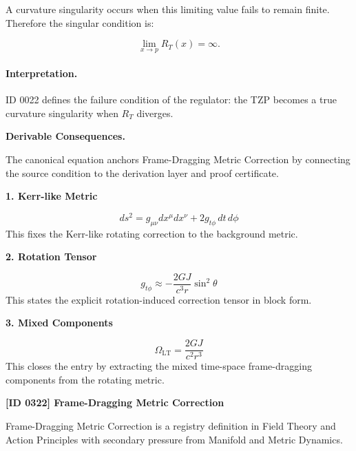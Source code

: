 A curvature singularity occurs when this limiting value fails to remain finite. Therefore the singular condition is:

\begin{equation}
\boxed{
\lim_{x\to p}R_T(x)=\infty .
}
\end{equation}

\paragraph{Interpretation.}
ID 0022 defines the failure condition of the regulator: the TZP becomes a true curvature singularity when $R_T$ diverges.

\par\vspace{0.35em}
\noindent\textbf{Derivable Consequences.}\quad
\begingroup
\footnotesize
\raggedright
The canonical equation anchors Frame-Dragging Metric Correction by connecting the source condition to the derivation layer and proof certificate.
\par\endgroup

\noindent\textbf{1. Kerr-like Metric}\par
\[
ds^{2}=g_{\mu\nu}dx^{\mu}dx^{\nu}+2g_{t\phi}\,dt\,d\phi
\]
\noindent This fixes the Kerr-like rotating correction to the background metric.\par
\noindent\textbf{2. Rotation Tensor}\par
\[
g_{t\phi}\approx-\frac{2GJ}{c^{3}r}\sin^{2}\theta
\]
\noindent This states the explicit rotation-induced correction tensor in block form.\par
\noindent\textbf{3. Mixed Components}\par
\[
\Omega_{\mathrm{LT}}=\frac{2GJ}{c^{2}r^{3}}
\]
\noindent This closes the entry by extracting the mixed time-space frame-dragging components from the rotating metric.\par

\clearpage
\noindent\textbf{[ID 0322] Frame-Dragging Metric Correction}\par
\vspace{0.35em}
\begingroup\small
{}
Frame-Dragging Metric Correction is a registry definition in Field Theory and Action Principles with secondary pressure from Manifold and Metric Dynamics.

